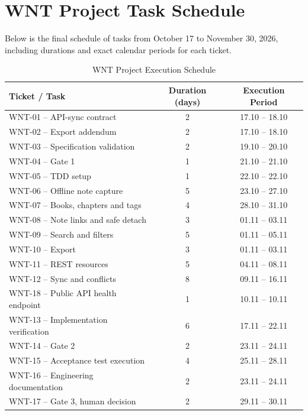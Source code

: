 \documentclass[11pt, a4paper]{article}
\begin{document}
\section*{WNT Project Task Schedule}

Below is the final schedule of tasks from October 17 to November 30, 2026, including durations and exact calendar periods for each ticket.

\begin{table}[htbp]
\centering
\caption{WNT Project Execution Schedule}
\label{tab:wnt_schedule}
\begin{tabular}{lcc}
\toprule
\textbf{Ticket / Task} & \textbf{Duration (days)} & \textbf{Execution Period} \\
\midrule
WNT-01 -- API-sync contract & 2 & 17.10 -- 18.10 \\
WNT-02 -- Export addendum & 2 & 17.10 -- 18.10 \\
WNT-03 -- Specification validation & 2 & 19.10 -- 20.10 \\
WNT-04 -- Gate 1 & 1 & 21.10 -- 21.10 \\
WNT-05 -- TDD setup & 1 & 22.10 -- 22.10 \\
WNT-06 -- Offline note capture & 5 & 23.10 -- 27.10 \\
WNT-07 -- Books, chapters and tags & 4 & 28.10 -- 31.10 \\
WNT-08 -- Note links and safe detach & 3 & 01.11 -- 03.11 \\
WNT-09 -- Search and filters & 5 & 01.11 -- 05.11 \\
WNT-10 -- Export & 3 & 01.11 -- 03.11 \\
WNT-11 -- REST resources & 5 & 04.11 -- 08.11 \\
WNT-12 -- Sync and conflicts & 8 & 09.11 -- 16.11 \\
WNT-18 -- Public API health endpoint & 1 & 10.11 -- 10.11 \\
WNT-13 -- Implementation verification & 6 & 17.11 -- 22.11 \\
WNT-14 -- Gate 2 & 2 & 23.11 -- 24.11 \\
WNT-15 -- Acceptance test execution & 4 & 25.11 -- 28.11 \\
WNT-16 -- Engineering documentation & 2 & 23.11 -- 24.11 \\
WNT-17 -- Gate 3, human decision & 2 & 29.11 -- 30.11 \\
\bottomrule
\end{tabular}
\end{table}
\end{document}
